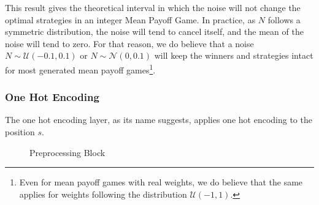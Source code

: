 This result gives the theoretical interval in which the noise will not change the optimal strategies in an integer Mean Payoff Game.
\newline In practice, as $N$ follows a symmetric distribution, the noise will tend to cancel itself, and the mean of the noise will tend to zero. 
\newline For that reason, we do believe that a noise $N\sim \mathcal{U}(-0.1,0.1)$ or $N\sim \mathcal{N}(0,0.1)$ will keep the winners and strategies intact for most generated mean payoff games\footnote{Even for mean payoff games with real weights, we do believe that the same applies for weights following the distribution $\mathcal{U}(-1,1)$.}.
\subsubsection{One Hot Encoding}
The one hot encoding layer, as its name suggests, applies one hot encoding to the position $s.$


\begin{figure}[H]
	\noindent
	
	\caption{Preprocessing Block}
	\label{fig:PreprocessingBlock}
\end{figure}
\newpage

